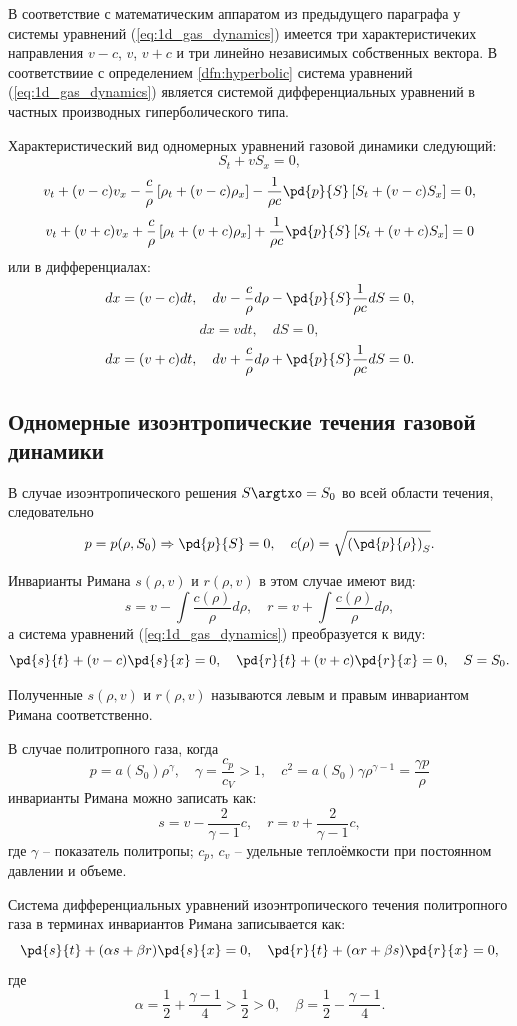 \documentclass[a4paper, 14pt]{extarticle}
\begin{document}
В соответствие с математическим аппаратом из предыдущего параграфа у системы уравнений (\ref{eq:1d_gas_dynamics}) имеется три характеристичеких направления $v-c$, $v$, $v+c$ и три линейно независимых собственных вектора. В соответствиие с определением \ref{dfn:hyperbolic} система уравнений (\ref{eq:1d_gas_dynamics}) является системой дифференциальных уравнений в частных производных \alert{гиперболического типа}.

Характеристический вид одномерных уравнений газовой динамики следующий:
\[
S_t + v S_x = 0,
\]
\[
v_t + (v-c)v_x -
\frac{c}{\rho} \left[\rho_t + (v-c)\rho_x	\right]-
\frac{1}{\rho c} \pd{p}{S}\left[ S_t + (v-c) S_x \right] = 0,
\]
\[
v_t + (v+c)v_x +
\frac{c}{\rho} \left[\rho_t + (v+c)\rho_x	\right] +
\frac{1}{\rho c} \pd{p}{S}\left[ S_t + (v+c) S_x \right] = 0
\]
или в дифференциалах:
\[
	dx = (v-c) dt, \quad dv - \frac{c}{\rho} d\rho - \pd{p}{S}\frac{1}{\rho c} dS = 0,
\]
\[
	dx = v dt,\quad dS  = 0,
\]
\[
	dx = (v+c) dt, \quad dv + \frac{c}{\rho} d\rho + \pd{p}{S}\frac{1}{\rho c} dS = 0.
\]

\subsection{Одномерные изоэнтропические течения газовой динамики}

В случае изоэнтропического решения  $S\argtxo = S_0$ во всей области течения, следовательно 
\[
	p = p(\rho, S_0) \Rightarrow \pd{p}{S} = 0, \quad c(\rho) = \sqrt{\left(\pd{p}{\rho}\right)_S}.
\]
		
		
Инварианты Римана $s(\rho,v)$ и $r(\rho,v)$ в этом случае имеют вид:
\[
s = v - \int\frac{c(\rho)}{\rho} d\rho,\quad
r = v + \int\frac{c(\rho)}{\rho} d\rho,
\]
а система уравнений (\ref{eq:1d_gas_dynamics}) преобразуется к виду:			
\[
\pd{s}{t} + (v-c) \pd{s}{x} = 0,\quad \pd{r}{t} + (v+c) \pd{r}{x} = 0, \quad S=S_0.
\]

Полученные $s(\rho,v)$ и $r(\rho,v)$ называются левым и правым инвариантом Римана соответственно.
			


В случае политропного газа, когда
\[
	p = a(S_0) \rho^\gamma,\quad \gamma = \frac{c_p}{c_V} > 1,\quad
	c^2 = a(S_0)\gamma \rho^{\gamma-1} = \frac{\gamma p}{\rho}
\]
инварианты Римана можно записать как:
\[
	s =  
	v- \frac{2}{\gamma-1}c,\quad
	r = 
	v + \frac{2}{\gamma-1}c,
\]
где $\gamma$ -- показатель политропы; $c_p$, $c_v$ -- удельные теплоёмкости при постоянном давлении и объеме.
	

Система дифференциальных уравнений изоэнтропического течения политропного газа в терминах инвариантов Римана записывается как:
\begin{equation}
	\label{eq:1d_polytrop_riman}
	\pd{s}{t}+(\alpha s + \beta r)\pd{s}{x} = 0,\quad
	\pd{r}{t}+(\alpha r + \beta s)\pd{r}{x} = 0,
\end{equation}
где
\[
	\alpha = \frac{1}{2}+\frac{\gamma-1}{4}>\frac{1}{2}>0,\quad
	\beta  = \frac{1}{2}-\frac{\gamma-1}{4}.
\]
\end{document}
